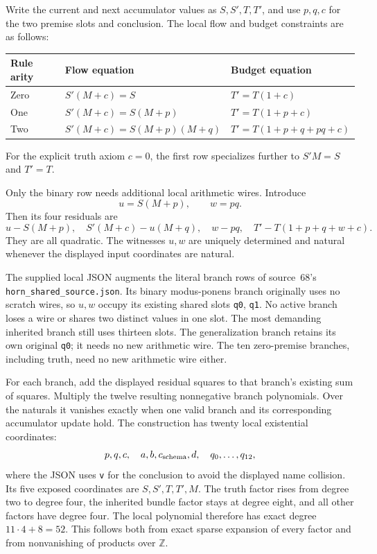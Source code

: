 Write the current and next accumulator values as $S,S',T,T'$, and use
$p,q,c$ for the two premise slots and conclusion.  The local flow and
budget constraints are as follows:
\begin{center}
\begin{tabular}{lll}
\hline
Rule arity & Flow equation & Budget equation\\
\hline
Zero & $S'(M+c)=S$ & $T'=T(1+c)$\\
One & $S'(M+c)=S(M+p)$ & $T'=T(1+p+c)$\\
Two & $S'(M+c)=S(M+p)(M+q)$
    & $T'=T(1+p+q+pq+c)$\\
\hline
\end{tabular}
\end{center}
For the explicit truth axiom $c=0$, the first row specializes further to
$S'M=S$ and $T'=T$.

Only the binary row needs additional local arithmetic wires.  Introduce
\[
 u=S(M+p),\qquad w=pq.
\]
Then its four residuals are
\begin{equation}
 u-S(M+p),\quad S'(M+c)-u(M+q),\quad w-pq,\quad
 T'-T(1+p+q+w+c).                                        \label{eq:budget-four-rows}
\end{equation}
They are all quadratic.  The witnesses $u,w$ are uniquely determined and
natural whenever the displayed input coordinates are natural.

The supplied local JSON augments the literal branch rows of
source~68's \texttt{horn\_shared\_source.json}.  Its binary modus-ponens
branch originally uses no scratch wires, so $u,w$ occupy its existing
shared slots \texttt{q0}, \texttt{q1}.  No active branch loses a wire or
shares two distinct values in one slot.  The most demanding inherited
branch still uses thirteen slots.  The generalization branch retains its
own original \texttt{q0}; it needs no new arithmetic wire.  The ten
zero-premise branches, including truth, need no new arithmetic wire either.

For each branch, add the displayed residual squares to that branch's
existing sum of squares.  Multiply the twelve resulting nonnegative
branch polynomials.  Over the naturals it vanishes exactly when one valid
branch and its corresponding accumulator update hold.  The construction
has twenty local existential coordinates:
\[
 p,q,c,\quad a,b,c_{\rm schema},d,\quad q_0,\ldots,q_{12},
\]
where the JSON uses \texttt{v} for the conclusion to avoid the displayed
name collision.  Its five exposed coordinates are $S,S',T,T',M$.
The truth factor rises from degree two to degree four, the inherited
bundle factor stays at degree eight, and all other factors have degree
four.  The local polynomial therefore has exact degree
$11\cdot4+8=52$.  This follows both from exact sparse expansion of every
factor and from nonvanishing of products over $\mathbb Z$.

